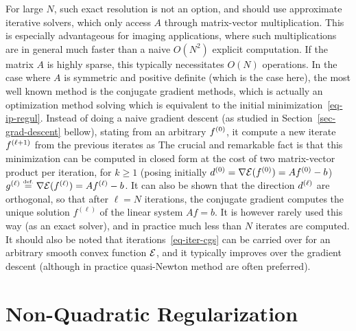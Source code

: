 For large $N$, such exact resolution is not an option, and should use approximate iterative solvers, which only access $A$ through matrix-vector multiplication. This is especially advantageous for imaging applications, where such multiplications are in general much faster than a naive $O(N^2)$ explicit computation. If the matrix $A$ is highly sparse, this typically necessitates $O(N)$ operations. 
%
In the case where $A$ is symmetric and positive definite (which is the case here), the most well known method is the conjugate gradient methods, which is actually an optimization method solving
which is equivalent to the initial minimization~\eqref{eq-ip-regul}. Instead of doing a naive gradient descent (as studied in Section~\ref{sec-grad-descent} bellow), stating from an arbitrary $\itz{f}$, it compute a new iterate $\iit{f}$ from the previous iterates as
The crucial and remarkable fact is that this minimization can be computed in closed form at the cost of two matrix-vector product per iteration, for $k \geq 1$ (posing initially $\itz{d} = \nabla \Ee(\itz{f}) = A\itz{f}-b$)
$\it{g} \eqdef \nabla \Ee(\it{f}) = A\it{f}-b$.
%
It can also be shown that the direction $\it{d}$ are orthogonal, so that after $\ell=N$ iterations, the conjugate gradient computes the unique solution $f^{(\ell)}$ of the linear system $A f = b$.  It is however rarely used this way (as an exact solver), and in practice much less than $N$ iterates are computed.
%
It should also be noted that iterations~\eqref{eq-iter-cgs} can be carried over for an arbitrary smooth convex function $\Ee$, and it typically improves over the gradient descent (although in practice quasi-Newton method are often preferred). 



\section{Non-Quadratic Regularization}

